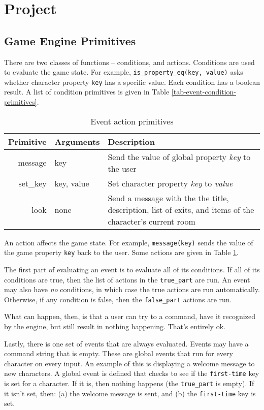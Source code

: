 \documentclass{article}
\newcommand{\enterProblemHeader}[1]{
}
\newcommand{\exitProblemHeader}[1]{
\nobreak\extramarks{#1}{}\nobreak
}
\newcounter{homeworkProblemCounter} %
\newcommand{\homeworkProblemName}{}
\newenvironment{homeworkProblem}[1][Problem \arabic{homeworkProblemCounter}]{ %
\stepcounter{homeworkProblemCounter} %
\renewcommand{\homeworkProblemName}{#1} %
\section{\homeworkProblemName} %
\enterProblemHeader{\homeworkProblemName} %
}{
\exitProblemHeader{\homeworkProblemName} %
}
\newcommand{\homeworkSectionName}{}
\newenvironment{homeworkSection}[1]{ %
\renewcommand{\homeworkSectionName}{#1} %
\subsection{\homeworkSectionName} %
\enterProblemHeader{\homeworkProblemName\ [\homeworkSectionName]} %
}{
\enterProblemHeader{\homeworkProblemName} %
}
\begin{document}
\begin{homeworkProblem}[Project]
\begin{homeworkSection}{Game Engine Primitives}
	There are two classes of functions -- conditions, and actions. Conditions are used to evaluate the game state. For example, \texttt{is\_property\_eq(key, value)} asks whether character property \texttt{key} has a specific value. Each condition has a boolean result. A list of condition primitives is given in Table \ref{tab-event-condition-primitives}.
	
	\begin{table}
		\begin{tabularx}{\textwidth}{|r|l|X|}
			\hline
			Primitive & Arguments & Description \\
			\hline \hline
			message & key & Send the value of global property \textit{key} to the user \\
			set\_key & key, value & Set character property \textit{key} to \textit{value} \\
			look & none & Send a message with the the title, description, list of exits, and items of the character's current room \\
			\hline
		\end{tabularx}
		\caption{Event action primitives}
		\label{tab:event-action-primitives}
	\end{table}

	An action affects the game state. For example, \texttt{message(key)} sends the value of the game property \texttt{key} back to the user. Some actions are given in Table \ref{tab:event-action-primitives}.

	The first part of evaluating an event is to evaluate all of its conditions. If all of its conditions are true, then the list of actions in the \texttt{true\_part} are run. An event may also have \textit{no} conditions, in which case the true actions are run automatically. Otherwise, if any condition is false, then the \texttt{false\_part} actions are run.

	What can happen, then, is that a user can try to a command, have it recognized by the engine, but still result in nothing happening. That's entirely ok.

	Lastly, there is one set of events that are always evaluated. Events may have a command string that is empty. These are global events that run for every character on every input. An example of this is displaying a welcome message to new characters. A global event is defined that checks to see if the \texttt{first-time} key is set for a character. If it is, then nothing happens (the \texttt{true\_part} is empty). If it isn't set, then: (a) the welcome message is sent, and (b) the \texttt{first-time} key is set.
\end{homeworkSection}



\end{homeworkProblem}
\end{document}
